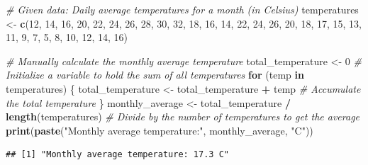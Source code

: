 \documentclass[
]{book}
\newenvironment{Shaded}{\begin{snugshade}}{\end{snugshade}}
\newcommand{\CommentTok}[1]{\textcolor[rgb]{0.56,0.35,0.01}{\textit{#1}}}
\newcommand{\ControlFlowTok}[1]{\textcolor[rgb]{0.13,0.29,0.53}{\textbf{#1}}}
\newcommand{\DecValTok}[1]{\textcolor[rgb]{0.00,0.00,0.81}{#1}}
\newcommand{\FunctionTok}[1]{\textcolor[rgb]{0.13,0.29,0.53}{\textbf{#1}}}
\newcommand{\NormalTok}[1]{#1}
\newcommand{\OtherTok}[1]{\textcolor[rgb]{0.56,0.35,0.01}{#1}}
\newcommand{\SpecialCharTok}[1]{\textcolor[rgb]{0.81,0.36,0.00}{\textbf{#1}}}
\newcommand{\StringTok}[1]{\textcolor[rgb]{0.31,0.60,0.02}{#1}}
\begin{document}
\begin{Shaded}
\begin{Highlighting}[]
\CommentTok{\# Given data: Daily average temperatures for a month (in Celsius)}
\NormalTok{temperatures }\OtherTok{\textless{}{-}} \FunctionTok{c}\NormalTok{(}\DecValTok{12}\NormalTok{, }\DecValTok{14}\NormalTok{, }\DecValTok{16}\NormalTok{, }\DecValTok{20}\NormalTok{, }\DecValTok{22}\NormalTok{, }\DecValTok{24}\NormalTok{, }\DecValTok{26}\NormalTok{, }\DecValTok{28}\NormalTok{, }\DecValTok{30}\NormalTok{, }\DecValTok{32}\NormalTok{, }\DecValTok{18}\NormalTok{, }\DecValTok{16}\NormalTok{, }\DecValTok{14}\NormalTok{, }\DecValTok{22}\NormalTok{, }\DecValTok{24}\NormalTok{, }\DecValTok{26}\NormalTok{, }\DecValTok{20}\NormalTok{, }\DecValTok{18}\NormalTok{, }\DecValTok{17}\NormalTok{, }\DecValTok{15}\NormalTok{, }\DecValTok{13}\NormalTok{, }\DecValTok{11}\NormalTok{, }\DecValTok{9}\NormalTok{, }\DecValTok{7}\NormalTok{, }\DecValTok{5}\NormalTok{, }\DecValTok{8}\NormalTok{, }\DecValTok{10}\NormalTok{, }\DecValTok{12}\NormalTok{, }\DecValTok{14}\NormalTok{, }\DecValTok{16}\NormalTok{)}

\CommentTok{\# Manually calculate the monthly average temperature}
\NormalTok{total\_temperature }\OtherTok{\textless{}{-}} \DecValTok{0}  \CommentTok{\# Initialize a variable to hold the sum of all temperatures}
\ControlFlowTok{for}\NormalTok{ (temp }\ControlFlowTok{in}\NormalTok{ temperatures) \{}
\NormalTok{  total\_temperature }\OtherTok{\textless{}{-}}\NormalTok{ total\_temperature }\SpecialCharTok{+}\NormalTok{ temp  }\CommentTok{\# Accumulate the total temperature}
\NormalTok{\}}
\NormalTok{monthly\_average }\OtherTok{\textless{}{-}}\NormalTok{ total\_temperature }\SpecialCharTok{/} \FunctionTok{length}\NormalTok{(temperatures)  }\CommentTok{\# Divide by the number of temperatures to get the average}
\FunctionTok{print}\NormalTok{(}\FunctionTok{paste}\NormalTok{(}\StringTok{"Monthly average temperature:"}\NormalTok{, monthly\_average, }\StringTok{"C"}\NormalTok{))}
\end{Highlighting}
\end{Shaded}

\begin{verbatim}
## [1] "Monthly average temperature: 17.3 C"
\end{verbatim}
\end{document}
